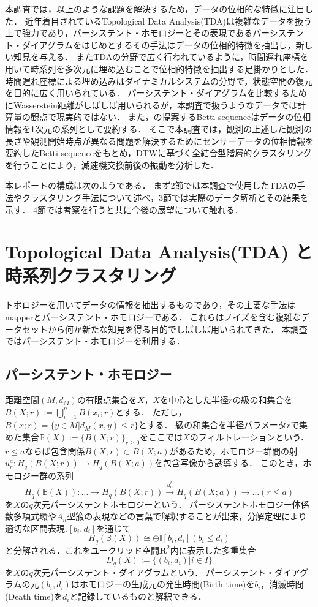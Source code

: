 \documentclass{jarticle}
\begin{document}
本調査では，以上のような課題を解決するため，データの位相的な特徴に注目した．
近年着目されているTopological Data Analysis(TDA)は複雑なデータを扱う上で強力であり，パーシステント・ホモロジー\cite{Edelsbrunner2002}とその表現であるパーシステント・ダイアグラム\cite{Otter2017}をはじめとするその手法はデータの位相的特徴を抽出し，新しい知見を与える．
またTDAの分野で広く行われているように，時間遅れ座標を用いて時系列を多次元に埋め込むことで位相的特徴を抽出する足掛かりとした．
時間遅れ座標による埋め込みはダイナミカルシステムの分野で，状態空間の復元を目的に広く用いられている．
パーシステント・ダイアグラムを比較するためにWasserstein距離\cite{Mileyko2011}がしばしば用いられるが，本調査で扱うようなデータでは計算量の観点で現実的ではない．
また，\cite{Umeda2017}の提案するBetti sequenceはデータの位相情報を1次元の系列として要約する．
そこで本調査では，観測の上述した観測の長さや観測開始時点が異なる問題を解決するためにセンサーデータの位相情報を要約したBetti sequenceをもとめ，DTWに基づく全結合型階層的クラスタリングを行うことにより，減速機交換前後の振動を分析した．


本レポートの構成は次のようである．
まず2節では本調査で使用したTDAの手法やクラスタリング手法について述べ，3節では実際のデータ解析とその結果を示す．
4節では考察を行うと共に今後の展望について触れる．

\section{Topological Data Analysis(TDA) と時系列クラスタリング}
トポロジーを用いてデータの情報を抽出するものであり，その主要な手法はmapper\cite{Singh2007}とパーシステント・ホモロジー\cite{Edelsbrunner2002}である．
これらはノイズを含む複雑なデータセットから何か新たな知見を得る目的でしばしば用いられてきた．
本調査ではパーシステント・ホモロジーを利用する．

\subsection{パーシステント・ホモロジー}
距離空間$(M, d_M)$の有限点集合を$X$，$X$を中心とした半径$r$の級の和集合を$B(X;r):=\bigcup_{i=1}^n B(x_i;r)$とする．
ただし，$B(x;r) =\{y \in M | d_M(x,y) \leq r\}$とする．
級の和集合を半径パラメータ$r$で集めた集合$\mathbb B(X):=\{B(X;r)\}_{r\geq 0}$をここでは$X$のフィルトレーションという．
$r\leq a$ならば包含関係$B(X;r)\subset B(X;a)$があるため，ホモロジー群間の射$u_r^a : H_q(B(X;r))\rightarrow H_q(B(X;a)) $を包含写像から誘導する．
このとき，ホモロジー群の系列
$$
H_q(\mathbb B(X)):\dots\rightarrow H_q(B(X;r))\overset{u_a^b}{\rightarrow} H_q(B(X;a))\rightarrow\dots (r\leq a)
$$
を$X$の$q$次元パーシステントホモロジーという．
パーシステントホモロジー体係数多項式環や$A_n$型箙の表現などの言葉で解釈することが出来，分解定理により適切な区間表現$\mathbb I[b_i, d_i] $を通じて
$$
H_q(\mathbb B(X))\cong\oplus\mathbb I[b_i,d_i] (b_i\leq d_i)
$$
と分解される．これをユークリッド空間$\mathbf R^2$内に表示した多重集合
$$
D_q(X):= \{(b_i,d_i) | i \in I\}
$$
を$X$の$q$次元パーシステント・ダイアグラムという．
パーシステント・ダイアグラムの元$(b_i, d_i)$はホモロジーの生成元の発生時間(Birth time)を$b_i$，消滅時間(Death time)を$d_i$と記録しているものと解釈できる．
\end{document}
